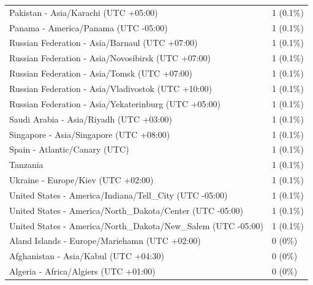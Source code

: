 \begin{appendix}
\begin{table}
{\begin{tabular}[t]{ll}
\hspace{1em}Pakistan - Asia/Karachi (UTC +05:00) & 1 (0.1\%)\\
\addlinespace
\hspace{1em}Panama - America/Panama (UTC -05:00) & 1 (0.1\%)\\
\hspace{1em}Russian Federation - Asia/Barnaul (UTC +07:00) & 1 (0.1\%)\\
\hspace{1em}Russian Federation - Asia/Novosibirsk (UTC +07:00) & 1 (0.1\%)\\
\hspace{1em}Russian Federation - Asia/Tomsk (UTC +07:00) & 1 (0.1\%)\\
\hspace{1em}Russian Federation - Asia/Vladivostok (UTC +10:00) & 1 (0.1\%)\\
\addlinespace
\hspace{1em}Russian Federation - Asia/Yekaterinburg (UTC +05:00) & 1 (0.1\%)\\
\hspace{1em}Saudi Arabia - Asia/Riyadh (UTC +03:00) & 1 (0.1\%)\\
\hspace{1em}Singapore - Asia/Singapore (UTC +08:00) & 1 (0.1\%)\\
\hspace{1em}Spain - Atlantic/Canary (UTC) & 1 (0.1\%)\\
\hspace{1em}Tanzania & 1 (0.1\%)\\
\addlinespace
\hspace{1em}Ukraine - Europe/Kiev (UTC +02:00) & 1 (0.1\%)\\
\hspace{1em}United States - America/Indiana/Tell\_City (UTC -05:00) & 1 (0.1\%)\\
\hspace{1em}United States - America/North\_Dakota/Center (UTC -05:00) & 1 (0.1\%)\\
\hspace{1em}United States - America/North\_Dakota/New\_Salem (UTC -05:00) & 1 (0.1\%)\\
\hspace{1em}Aland Islands - Europe/Mariehamn (UTC +02:00) & 0 (0\%)\\
\addlinespace
\hspace{1em}Afghanistan - Asia/Kabul (UTC +04:30) & 0 (0\%)\\
\hspace{1em}Algeria - Africa/Algiers (UTC +01:00) & 0 (0\%)\\

\end{tabular}}
\end{table}
\end{appendix}
